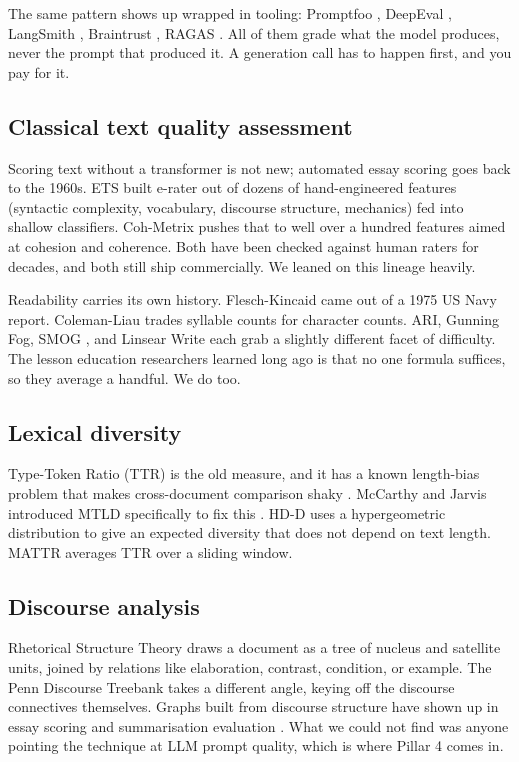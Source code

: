 \documentclass[conference]{IEEEtran}
\begin{document}
The same pattern shows up wrapped in tooling: Promptfoo \cite{promptfoo}, DeepEval \cite{deepeval}, LangSmith \cite{langsmith}, Braintrust \cite{braintrust}, RAGAS \cite{ragas}. All of them grade what the model produces, never the prompt that produced it. A generation call has to happen first, and you pay for it.

\subsection{Classical text quality assessment}
Scoring text without a transformer is not new; automated essay scoring goes back to the 1960s. ETS built e-rater \cite{erater} out of dozens of hand-engineered features (syntactic complexity, vocabulary, discourse structure, mechanics) fed into shallow classifiers. Coh-Metrix \cite{cohmetrix} pushes that to well over a hundred features aimed at cohesion and coherence. Both have been checked against human raters for decades, and both still ship commercially. We leaned on this lineage heavily.

Readability carries its own history. Flesch-Kincaid \cite{flesch} came out of a 1975 US Navy report. Coleman-Liau \cite{coleman} trades syllable counts for character counts. ARI, Gunning Fog, SMOG \cite{smog}, and Linsear Write each grab a slightly different facet of difficulty. The lesson education researchers learned long ago is that no one formula suffices, so they average a handful. We do too.

\subsection{Lexical diversity}
Type-Token Ratio (TTR) is the old measure, and it has a known length-bias problem that makes cross-document comparison shaky \cite{mccarthy_jarvis_2010}. McCarthy and Jarvis introduced MTLD specifically to fix this \cite{mtld}. HD-D uses a hypergeometric distribution to give an expected diversity that does not depend on text length. MATTR averages TTR over a sliding window.

\subsection{Discourse analysis}
Rhetorical Structure Theory \cite{rst} draws a document as a tree of nucleus and satellite units, joined by relations like elaboration, contrast, condition, or example. The Penn Discourse Treebank \cite{pdtb} takes a different angle, keying off the discourse connectives themselves. Graphs built from discourse structure have shown up in essay scoring \cite{guinaudeau_strube} and summarisation evaluation \cite{xu_disco}. What we could not find was anyone pointing the technique at LLM prompt quality, which is where Pillar 4 comes in.
\end{document}
